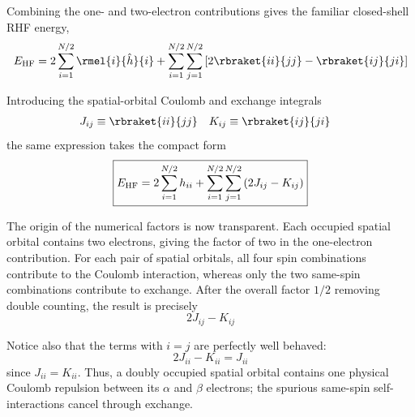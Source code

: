 \documentclass[11pt,a4paper,titlepage]{article}
\numberwithin{equation}{section}
\newcommand{\EHF}{E_\text{HF}}
\newcommand{\hh}{\Hat{h}}
\begin{document}
Combining the one- and two-electron contributions gives the familiar
closed-shell RHF energy,
\begin{equation}
  \EHF
  =
  2\sum_{i=1}^{N/2}
  \rmel{i}{\hh}{i}
  +
  \sum_{i=1}^{N/2}
  \sum_{j=1}^{N/2}
  \qty[
    2\rbraket{ii}{jj}
    -
    \rbraket{ij}{ji}
  ]
  \label{eq:rhf-energy-spatial}
\end{equation}

Introducing the spatial-orbital Coulomb and exchange integrals
\begin{align}
  J_{ij}
  &\equiv
  \rbraket{ii}{jj}
  &
  K_{ij}
  &\equiv
  \rbraket{ij}{ji}
\end{align}
the same expression takes the compact form
\begin{equation}
  \boxed{
  \EHF
  =
  2\sum_{i=1}^{N/2}h_{ii}
  +
  \sum_{i=1}^{N/2}
  \sum_{j=1}^{N/2}
  \qty(
    2J_{ij}-K_{ij}
  )
  }
  \label{eq:rhf-energy-jk}
\end{equation}

The origin of the numerical factors is now transparent. Each occupied
spatial orbital contains two electrons, giving the factor of two in the
one-electron contribution. For each pair of spatial orbitals, all four spin
combinations contribute to the Coulomb interaction, whereas only the two
same-spin combinations contribute to exchange. After the overall factor
$1/2$ removing double counting, the result is precisely
\begin{equation}
  2J_{ij}-K_{ij}
\end{equation}

Notice also that the terms with $i=j$ are perfectly well behaved:
\begin{equation}
  2J_{ii}-K_{ii}
  =
  J_{ii}
\end{equation}
since $J_{ii}=K_{ii}$. Thus, a doubly occupied spatial orbital contains one
physical Coulomb repulsion between its $\alpha$ and $\beta$ electrons; the
spurious same-spin self-interactions cancel through exchange.

\end{document}
